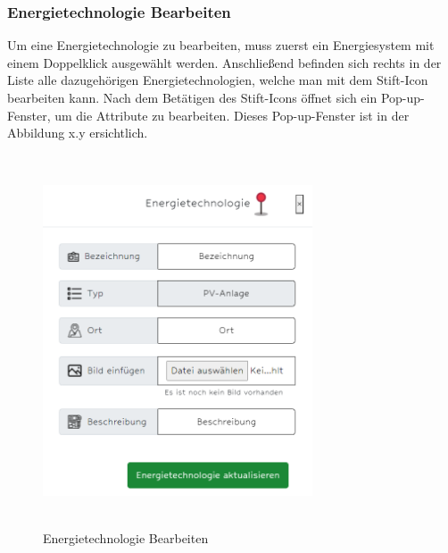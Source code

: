 \newpage
\subsubsection{Energietechnologie Bearbeiten}
Um eine Energietechnologie zu bearbeiten, muss zuerst ein Energiesystem mit einem Doppelklick ausgewählt werden. Anschließend befinden sich rechts in der Liste alle dazugehörigen Energietechnologien, welche man mit dem Stift-Icon bearbeiten kann. Nach dem Betätigen des Stift-Icons öffnet sich ein Pop-up-Fenster, um die Attribute zu bearbeiten. Dieses Pop-up-Fenster ist in der Abbildung x.y ersichtlich.
\newline
\begin{figure}[h]
	\centering
	\includegraphics[height=11cm,width=8cm]{images/ETbearbeitenPop}
	\caption{Energietechnologie Bearbeiten}
	\label{fig:CSS_System}
\end{figure}


